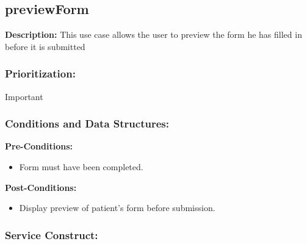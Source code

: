 \subsection{previewForm}
\textbf{Description:}
This use case allows the user to preview the form he has filled in before it is submitted
\subsubsection{Prioritization:}
Important
\subsubsection{Conditions and Data Structures:}
\textbf{Pre-Conditions:}
\begin{itemize}
	\item Form must have been completed.
\end{itemize}

\textbf{Post-Conditions:}
\begin{itemize}
	\item Display preview of patient's form before submission.
\end{itemize}
 
\subsubsection{Service Construct:}
